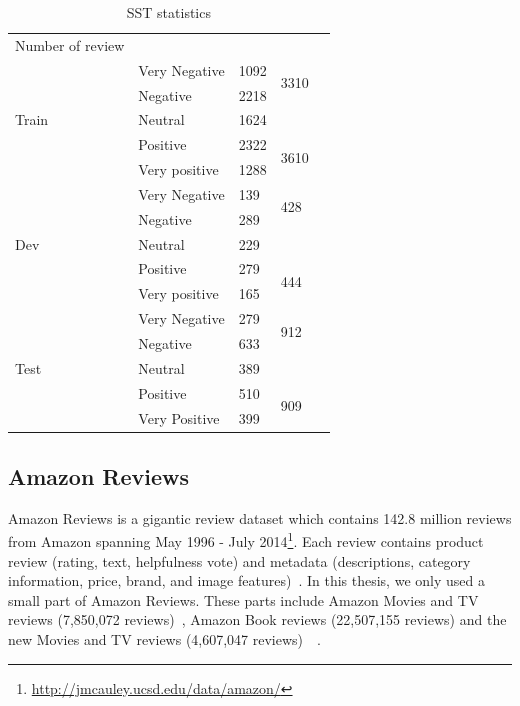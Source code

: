 \begin{table}[H]
    \centering
    \caption{SST statistics}
    \label{table:sststatistic_5}
    \begin{tabular}{lllll}
        Number of review       &               &      &                       &  \\ \cline{1-4}
        \multirow{5}{*}{Train} & Very Negative & 1092 & \multirow{2}{*}{3310} &  \\ \cline{2-3}
        & Negative      & 2218 &                       &  \\ \cline{2-4}
        & Neutral       & 1624 &                       &  \\ \cline{2-4}
        & Positive      & 2322 & \multirow{2}{*}{3610} &  \\ \cline{2-3}
        & Very positive & 1288 &                       &  \\ \cline{1-4}
        \multirow{5}{*}{Dev}   & Very Negative & 139  & \multirow{2}{*}{428}  &  \\ \cline{2-3}
        & Negative      & 289  &                       &  \\ \cline{2-4}
        & Neutral       & 229  &                       &  \\ \cline{2-4}
        & Positive      & 279  & \multirow{2}{*}{444}  &  \\ \cline{2-3}
        & Very positive & 165  &                       &  \\ \cline{1-4}
        \multirow{5}{*}{Test}  & Very Negative & 279  & \multirow{2}{*}{912}  &  \\ \cline{2-3}
        & Negative      & 633  &                       &  \\ \cline{2-4}
        & Neutral       & 389  &                       &  \\ \cline{2-4}
        & Positive      & 510  & \multirow{2}{*}{909}  &  \\ \cline{2-3}
        & Very Positive & 399  &                       &  \\ \cline{2-4}
    \end{tabular}
\end{table}
\subsection{Amazon Reviews}
Amazon Reviews is a gigantic review dataset
which contains 142.8 million reviews from Amazon spanning May 1996 - July 2014\footnote{\url{http://jmcauley.ucsd.edu/data/amazon/}}.
Each review contains product review (rating, text, helpfulness vote) and metadata (descriptions, category information, price, brand, and image features)~\cite{amazon-reviews}.
In this thesis, we only used a small part of Amazon Reviews.
These parts include Amazon Movies and TV reviews (7,850,072 reviews)~\cite{mcauley2013hidden}, Amazon Book reviews (22,507,155 reviews) and the new Movies and TV reviews (4,607,047 reviews)~\cite{McAuleyTSH15}~\cite{HeM16}.

